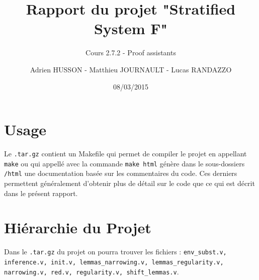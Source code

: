 \documentclass[a4paper,10pt]{scrartcl}
\title{Rapport du projet "Stratified System F"}
\subtitle{Cours 2.7.2 - Proof assistants}
\author{Adrien HUSSON - Matthieu JOURNAULT - Lucas RANDAZZO}
\date{08/03/2015}
\begin{document}
     \maketitle
     \section{Usage}
     Le \texttt{.tar.gz} contient un Makefile qui permet de compiler le projet en appellant \texttt{make} ou qui appellé avec la commande \texttt{make html} génère dans le sous-dossiers \texttt{/html} une documentation basée sur les commentaires du code. Ces derniers permettent généralement d'obtenir plus de détail sur le code que ce qui est décrit dans le présent rapport.
     \section{Hiérarchie du Projet}
     Dans le \texttt{.tar.gz} du projet on pourra trouver les fichiers : \texttt{env\_subst.v, inference.v, init.v, lemmas\_narrowing.v, lemmas\_regularity.v, narrowing.v, red.v, regularity.v, shift\_lemmas.v}. 
\end{document}
